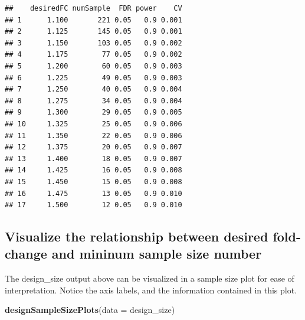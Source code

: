 \documentclass[]{book}
\newenvironment{Shaded}{\begin{snugshade}}{\end{snugshade}}
\newcommand{\CommentTok}[1]{\textcolor[rgb]{0.56,0.35,0.01}{\textit{#1}}}
\newcommand{\DataTypeTok}[1]{\textcolor[rgb]{0.13,0.29,0.53}{#1}}
\newcommand{\FloatTok}[1]{\textcolor[rgb]{0.00,0.00,0.81}{#1}}
\newcommand{\KeywordTok}[1]{\textcolor[rgb]{0.13,0.29,0.53}{\textbf{#1}}}
\newcommand{\NormalTok}[1]{#1}
\newcommand{\OperatorTok}[1]{\textcolor[rgb]{0.81,0.36,0.00}{\textbf{#1}}}
\newcommand{\OtherTok}[1]{\textcolor[rgb]{0.56,0.35,0.01}{#1}}
\newcommand{\StringTok}[1]{\textcolor[rgb]{0.31,0.60,0.02}{#1}}
\begin{document}
\begin{Shaded}
\end{Shaded}

\begin{verbatim}
##    desiredFC numSample  FDR power    CV
## 1      1.100       221 0.05   0.9 0.001
## 2      1.125       145 0.05   0.9 0.001
## 3      1.150       103 0.05   0.9 0.002
## 4      1.175        77 0.05   0.9 0.002
## 5      1.200        60 0.05   0.9 0.003
## 6      1.225        49 0.05   0.9 0.003
## 7      1.250        40 0.05   0.9 0.004
## 8      1.275        34 0.05   0.9 0.004
## 9      1.300        29 0.05   0.9 0.005
## 10     1.325        25 0.05   0.9 0.006
## 11     1.350        22 0.05   0.9 0.006
## 12     1.375        20 0.05   0.9 0.007
## 13     1.400        18 0.05   0.9 0.007
## 14     1.425        16 0.05   0.9 0.008
## 15     1.450        15 0.05   0.9 0.008
## 16     1.475        13 0.05   0.9 0.010
## 17     1.500        12 0.05   0.9 0.010
\end{verbatim}

\hypertarget{visualize-the-relationship-between-desired-fold-change-and-mininum-sample-size-number}{%
\subsection{Visualize the relationship between desired fold-change and mininum sample size number}\label{visualize-the-relationship-between-desired-fold-change-and-mininum-sample-size-number}}

The design\_size output above can be visualized in a sample size plot for ease of interpretation. Notice the axis labels, and the information contained in this plot.

\begin{Shaded}
\begin{Highlighting}[]
\KeywordTok{designSampleSizePlots}\NormalTok{(}\DataTypeTok{data =}\NormalTok{ design_size)}
\end{Highlighting}
\end{Shaded}
\end{document}
